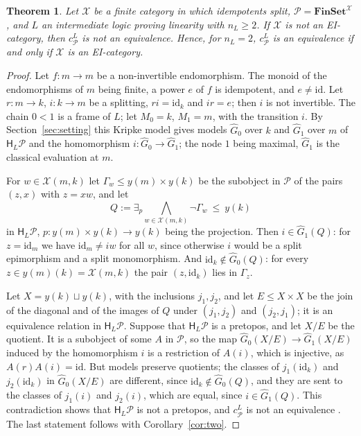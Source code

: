 \documentclass[11pt]{amsart}
\newtheorem{thm}{Theorem}[section]
\theoremstyle{definition}
\newcommand{\Fin}{\mathbf{FinSet}}
\newcommand{\HH}{\mathsf H}
\newcommand{\cX}{\mathcal X}
\newcommand{\cP}{\mathcal P}
\newcommand{\id}{\mathrm{id}}
\begin{document}
\begin{thm}\label{thm:nonEI}
Let $\cX$ be a finite category in which idempotents split, $\cP=
\Fin^{\cX}$, and $L$ an intermediate logic proving linearity with
$n_L\ge2$. If $\cX$ is not an EI-category, then $c^L_\cP$ is not an
equivalence. Hence, for $n_L=2$, $c^L_\cP$ is an equivalence if and
only if $\cX$ is an EI-category.
\end{thm}
\begin{proof}
Let $f\colon m\to m$ be a non-invertible endomorphism. The monoid of
the endomorphisms of $m$ being finite, a power $e$ of $f$ is
idempotent, and $e\ne\id$. Let $r\colon m\to k$, $i\colon k\to m$ be a
splitting, $ri=\id_k$ and $ir=e$; then $i$ is not invertible. The
chain $0<1$ is a frame of $L$; let $M_0=k$, $M_1=m$, with the
transition $i$. By Section~\ref{sec:setting} this Kripke model gives
models $\hat G_0$ over $k$ and $\hat G_1$ over $m$ of $\HH_L\cP$ and
the homomorphism $i\colon\hat G_0\to\hat G_1$; the node $1$ being
maximal, $\hat G_1$ is the classical evaluation at $m$.

For $w\in\cX(m,k)$ let $\Gamma_w\le y(m)\times y(k)$ be the subobject
in $\cP$ of the pairs $(z,x)$ with $z=xw$, and let
\[
Q:=\exists_{p}\bigwedge_{w\in\cX(m,k)}\neg\Gamma_w\ \le\ y(k)
\]
in $\HH_L\cP$, $p\colon y(m)\times y(k)\to y(k)$ being the projection.
Then $i\in\hat G_1(Q)$: for $z=\id_m$ we have $\id_m\ne iw$ for all
$w$, since otherwise $i$ would be a split epimorphism and a split
monomorphism. And $\id_k\notin\hat G_0(Q)$: for every $z\in y(m)(k)=
\cX(m,k)$ the pair $(z,\id_k)$ lies in $\Gamma_z$.

Let $X=y(k)\sqcup y(k)$, with the inclusions $j_1,j_2$, and let $E\le
X\times X$ be the join of the diagonal and of the images of $Q$ under
$(j_1,j_2)$ and $(j_2,j_1)$; it is an equivalence relation in
$\HH_L\cP$. Suppose that $\HH_L\cP$ is a pretopos, and let $X/E$ be the
quotient. It is a subobject of some $A$ in $\cP$, so the map $\hat
G_0(X/E)\to\hat G_1(X/E)$ induced by the homomorphism $i$ is a
restriction of $A(i)$, which is injective, as $A(r)A(i)=\id$. But
models preserve quotients; the classes of $j_1(\id_k)$ and
$j_2(\id_k)$ in $\hat G_0(X/E)$ are different, since $\id_k\notin\hat
G_0(Q)$, and they are sent to the classes of $j_1(i)$ and $j_2(i)$,
which are equal, since $i\in\hat G_1(Q)$. This contradiction shows that
$\HH_L\cP$ is not a pretopos, and $c^L_\cP$ is not an equivalence
\cite[Lemma~2.2]{Interm}. The last statement follows with
Corollary~\ref{cor:two}.
\end{proof}
\end{document}
